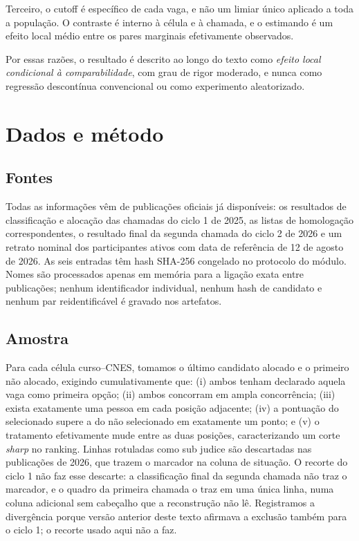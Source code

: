 \documentclass[11pt,a4paper]{article}
\begin{document}
Terceiro, o cutoff é específico de cada vaga, e não um limiar único aplicado a
toda a população. O contraste é interno à célula e à chamada, e o estimando é um
efeito local médio entre os pares marginais efetivamente observados.

Por essas razões, o resultado é descrito ao longo do texto como \emph{efeito
local condicional à comparabilidade}, com grau de rigor moderado, e nunca como
regressão descontínua convencional ou como experimento aleatorizado.

\section{Dados e método}
\label{sec:metodo}

\subsection{Fontes}

Todas as informações vêm de publicações oficiais já disponíveis: os resultados de
classificação e alocação das chamadas do ciclo 1 de 2025, as listas de
homologação correspondentes, o resultado final da segunda chamada do ciclo 2 de
2026 e um retrato nominal dos participantes ativos com data de referência de 12
de agosto de 2026. As seis entradas têm hash SHA-256 congelado no protocolo do
módulo. Nomes são processados apenas em memória para a ligação exata entre
publicações; nenhum identificador individual, nenhum hash de candidato e nenhum
par reidentificável é gravado nos artefatos.

\subsection{Amostra}

Para cada célula curso--CNES, tomamos o último candidato alocado e o primeiro
não alocado, exigindo cumulativamente que: (i) ambos tenham declarado aquela
vaga como primeira opção; (ii) ambos concorram em ampla concorrência; (iii)
exista exatamente uma pessoa em cada posição adjacente; (iv) a pontuação do
selecionado supere a do não selecionado em exatamente um ponto; e (v) o
tratamento efetivamente mude entre as duas posições, caracterizando um corte
\emph{sharp} no ranking. Linhas rotuladas como sub judice são descartadas
nas publicações de 2026, que trazem o marcador na coluna de situação. O recorte
do ciclo 1 não faz esse descarte: a classificação final da segunda chamada não
traz o marcador, e o quadro da primeira chamada o traz em uma única linha, numa
coluna adicional sem cabeçalho que a reconstrução não lê. Registramos a
divergência porque versão anterior deste texto afirmava a exclusão também para o
ciclo 1; o recorte usado aqui não a faz.
\end{document}
